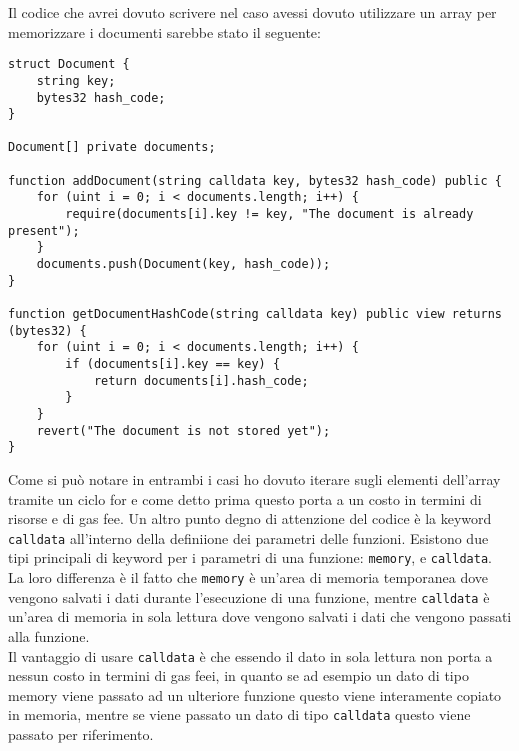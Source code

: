Il codice che avrei dovuto scrivere nel caso avessi dovuto utilizzare un array
per memorizzare i documenti sarebbe stato il seguente:
\begin{lstlisting}[language=Solidity]
struct Document {
    string key;
    bytes32 hash_code;
}

Document[] private documents;

function addDocument(string calldata key, bytes32 hash_code) public {
    for (uint i = 0; i < documents.length; i++) {
        require(documents[i].key != key, "The document is already present");
    }
    documents.push(Document(key, hash_code));
}

function getDocumentHashCode(string calldata key) public view returns (bytes32) {
    for (uint i = 0; i < documents.length; i++) {
        if (documents[i].key == key) {
            return documents[i].hash_code;
        }
    }
    revert("The document is not stored yet");
}
\end{lstlisting}

Come si può notare in entrambi i casi ho dovuto iterare sugli elementi
dell'array tramite un ciclo for e come detto prima questo porta a un costo in
termini di risorse e di gas fee.
\bigbreak
Un altro punto degno di attenzione del codice è la keyword \texttt{calldata}
all'interno della definiione dei parametri delle funzioni. Esistono due tipi
principali di keyword per i parametri di una funzione: \texttt{memory}, e
\texttt{calldata}. \\ 
La loro differenza è il fatto che \texttt{memory} è un'area di memoria
temporanea dove vengono salvati i dati durante l'esecuzione di una funzione,
mentre \texttt{calldata} è un'area di memoria in sola lettura dove vengono
salvati i dati che vengono passati alla funzione. \\
Il vantaggio di usare \texttt{calldata} è che essendo il dato in sola lettura 
non porta a nessun costo in termini di gas feei, in quanto se ad esempio un 
dato di tipo memory viene passato ad un ulteriore funzione questo viene
interamente copiato in memoria, mentre se viene passato un dato di tipo
\texttt{calldata} questo viene passato per riferimento.

